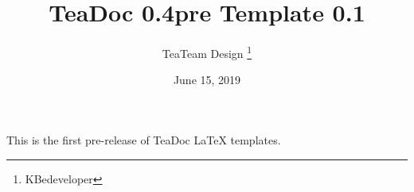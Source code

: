 \documentclass[12pt, a4, twoside]{article}
\title{TeaDoc 0.4pre Template 0.1}
\author{TeaTeam Design \thanks{KBedeveloper}}
\date{June 15, 2019}
\begin{document}
 
\begin{titlepage}
\maketitle
\end{titlepage}
 
This is the first pre-release of TeaDoc LaTeX templates.
 
\end{document}
